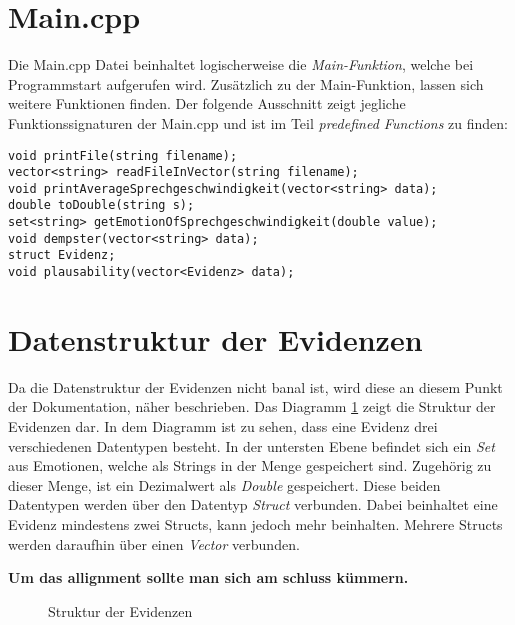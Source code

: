\section{Main.cpp}
Die Main.cpp Datei beinhaltet logischerweise die \textit{Main-Funktion}, welche bei Programmstart aufgerufen wird.
Zusätzlich zu der Main-Funktion, lassen sich weitere Funktionen finden. Der folgende Ausschnitt zeigt jegliche Funktionssignaturen der Main.cpp und ist im Teil \textit{predefined Functions} zu finden: 

\begin{lstlisting}[caption=Predefined classes/functions aus der Main.cpp, label=Bsp.1]
void printFile(string filename);
vector<string> readFileInVector(string filename);
void printAverageSprechgeschwindigkeit(vector<string> data); 
double toDouble(string s); 
set<string> getEmotionOfSprechgeschwindigkeit(double value); 
void dempster(vector<string> data);
struct Evidenz;
void plausability(vector<Evidenz> data);
\end{lstlisting}

\section{Datenstruktur der Evidenzen}
Da die Datenstruktur der Evidenzen nicht banal ist, wird diese an diesem Punkt der Dokumentation, näher beschrieben. Das Diagramm \ref{diagramm_evidenzen} zeigt die Struktur der Evidenzen dar. In dem Diagramm ist zu sehen, dass eine Evidenz drei verschiedenen Datentypen besteht. In der untersten Ebene befindet sich ein \textit{Set} aus Emotionen, welche als Strings in der Menge gespeichert sind. Zugehörig zu dieser Menge, ist ein Dezimalwert als \textit{Double} gespeichert. Diese beiden Datentypen werden über den Datentyp \textit{Struct} verbunden. Dabei beinhaltet eine Evidenz mindestens zwei Structs, kann jedoch mehr beinhalten. Mehrere Structs werden daraufhin über einen \textit{Vector} verbunden.

\textbf{Um das allignment sollte man sich am schluss kümmern.}
\begin{figure}
\centering
\caption{Struktur der Evidenzen}
\label{diagramm_evidenzen}
\end{figure}

